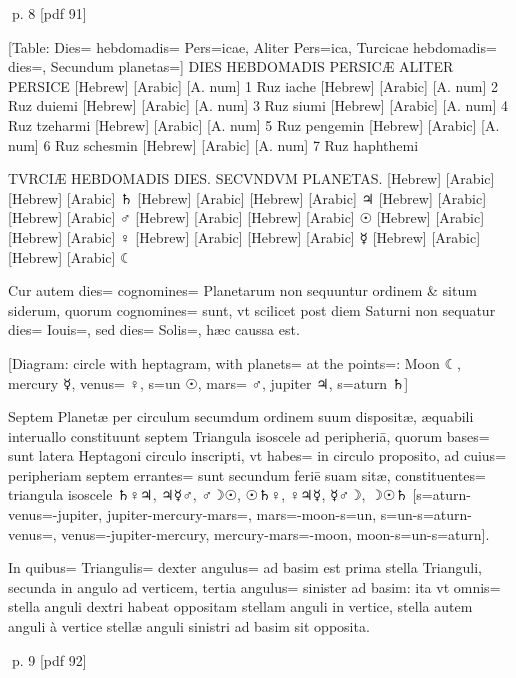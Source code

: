 \clearpage
p. 8 [pdf 91]

\begin{parnumbers}

[Table: Dies= hebdomadis= Pers=icae, Aliter Pers=ica, Turcicae hebdomadis= dies=, Secundum planetas=]   
DIES HEBDOMADIS PERSICÆ
ALITER PERSICE
[Hebrew]
[Arabic]
[A. num]
1
Ruz iache
[Hebrew]
[Arabic]
[A. num]
2
Ruz duiemi
[Hebrew]
[Arabic]
[A. num]
3
Ruz siumi
[Hebrew]
[Arabic]
[A. num]
4
Ruz tzeharmi
[Hebrew]
[Arabic]
[A. num]
5
Ruz pengemin
[Hebrew]
[Arabic]
[A. num]
6
Ruz schesmin
[Hebrew]
[Arabic]
[A. num]
7
Ruz haphthemi

TVRCIÆ HEBDOMADIS DIES.
SECVNDVM PLANETAS.
[Hebrew]
[Arabic]
[Hebrew]
[Arabic]
♄
[Hebrew]
[Arabic]
[Hebrew]
[Arabic]
♃
[Hebrew]
[Arabic]
[Hebrew]
[Arabic]
♂
[Hebrew]
[Arabic]
[Hebrew]
[Arabic]
☉
[Hebrew]
[Arabic]
[Hebrew]
[Arabic]
♀
[Hebrew]
[Arabic]
[Hebrew]
[Arabic]
☿
[Hebrew]
[Arabic]
[Hebrew]
[Arabic]
☾


Cur autem dies= cognomines= Planetarum non sequuntur ordinem \& situm siderum, quorum cognomines= sunt, vt scilicet post diem Saturni non sequatur dies= Iouis=, sed dies= Solis=, hæc caussa est.

[Diagram: circle with heptagram, with planets= at the points=: Moon ☾, mercury ☿, venus= ♀, s=un ☉, mars= ♂, jupiter ♃, s=aturn ♄]

Septem Planetæ per circulum secumdum ordinem suum dispositæ, æquabili interuallo constituunt septem Triangula isoscele ad peripheriā,  quorum bases= sunt latera Heptagoni circulo inscripti, vt habes= in circulo proposito, ad cuius= peripheriam septem errantes= sunt secundum feriē suam sitæ, constituentes= triangula isoscele ♄♀♃, ♃☿♂, ♂☽☉, ☉♄♀, ♀♃☿, ☿♂☽, ☽☉♄ [s=aturn-venus=-jupiter, jupiter-mercury-mars=, mars=-moon-s=un, s=un-s=aturn-venus=, venus=-jupiter-mercury, mercury-mars=-moon, moon-s=un-s=aturn].

In quibus= Triangulis= dexter angulus= ad basim est prima stella Trianguli, secunda in angulo ad verticem, tertia angulus= sinister ad basim: ita vt omnis= stella anguli dextri habeat oppositam stellam anguli in vertice, stella autem anguli à vertice stellæ anguli sinistri ad basim sit opposita.

\end{parnumbers}
\clearpage
p. 9 [pdf 92]

